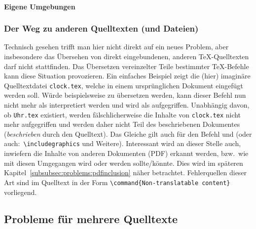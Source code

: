 \paragraph*{Eigene Umgebungen}\label{subsubsec:problems:uniqueenvironments}


\subsubsection{Der Weg zu anderen Quelltexten (und Dateien)}%
Technisch gesehen trifft man hier nicht direkt auf ein neues Problem, aber insbesondere das Übersehen von direkt eingebundenen, anderen \TeX{}-Quelltexten darf nicht stattfinden. Das Übersetzen vereinzelter Teile bestimmter \TeX{}-Befehle kann diese Situation provozieren. Ein einfaches Beispiel zeigt die (hier) imaginäre Quelltextdatei \texttt{clock.tex}, welche in einem ursprünglichen Dokument eingefügt werden soll.  
Würde beispielsweise \verb|| zu \verb|| übersetzen werden, kann dieser Befehl nun nicht mehr als \verb|| interpretiert werden und wird als \verb|| aufgegriffen. Unabhängig davon, ob \texttt{Uhr.tex} existiert, werden fälschlicherweise die Inhalte von \texttt{clock.tex} nicht mehr aufgegriffen und werden daher nicht Teil des beschriebenen Dokumentes (\textit{beschrieben} durch den Quelltext).
Das Gleiche gilt auch für den Befehl \verb|| und \verb|| (oder auch:\ \verb|\includegraphics| und Weitere). Interessant wird an dieser Stelle auch, inwiefern die Inhalte von anderen Dokumenten (PDF) erkannt werden, bzw.\ wie mit diesen Umgegangen wird oder werden sollte/könnte. Dies wird im späteren Kapitel~\ref{subsubsec:problems:pdfinclusion} näher betrachtet.
Fehlerquellen dieser Art sind im Quelltext in der Form \verb|\command{Non-translatable content}| vorliegend.

\newpage


\subsection{Probleme für mehrere Quelltexte}
